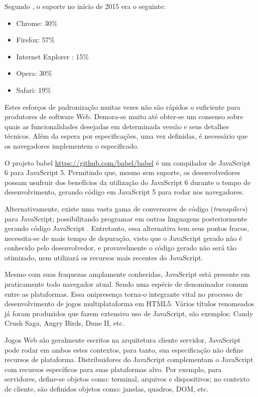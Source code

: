 Segundo \citet{ecmaSupport}, o suporte no início de 2015 era o seguinte:

\begin{itemize}
    \item Chrome: 30\%
    \item Firefox: 57\%
    \item Internet Explorer : 15\%
    \item Opera: 30\%
    \item Safari: 19\%
\end{itemize}

Estes esforços de padronização muitas vezes não são rápidos
o suficiente para produtores de software Web. Demora-se muito até
obter-se um consenso sobre quais as funcionalidades desejadas em
determinada versão e seus detalhes técnicos. Além da
espera por especificações, uma vez definidas, é necessário que os
navegadores implementem o especificado.

O projeto babel \url{https://github.com/babel/babel} é um compilador de
JavaScript 6 para JavaScript 5. Permitindo que, mesmo sem suporte, os
desenvolvedores possam usufruir dos benefícios da utilização do
JavaScript 6 durante o tempo de desenvolvimento, gerando código em
JavaScript 5 para rodar nos navegadores.

Alternativamente, existe uma vasta gama de conversores de código
(\textit{transpilers}) para JavaScript; possibilitando programar
em outras linguagens posteriormente gerando código JavaScript .
Entretanto, essa alternativa tem seus pontos fracos, necessita-se
de mais tempo de depuração, visto que o JavaScript gerado não é
conhecido pelo desenvolvedor, e provavelmente o código gerado não
será tão otimizado, nem utilizará os recursos mais recentes do
JavaScript.

Mesmo com suas fraquezas amplamente conhecidas, JavaScript está
presente em praticamente todo navegador atual. Sendo uma espécie de
denominador comum entre as plataformas. Essa onipresença torna-o
integrante vital no processo de desenvolvimento de jogos multiplataforma
em HTML5. Vários títulos renomeados já foram produzidos que fazem
extensivo uso de JavaScript, são exemplos: Candy Crush Saga, Angry
Birds, Dune II, etc.

Jogos Web são geralmente escritos na arquitetura cliente servidor,
JavaScript pode rodar em ambos estes contextos, para tanto, sua
especificação não define recursos de plataforma. Distribuidores do
JavaScript complementam o JavaScript com recursos específicos para
suas plataformas alvo. Por exemplo, para servidores, define-se objetos como:
terminal, arquivos e dispositivos; no contexto de cliente,
são definidos objetos como: janelas, quadros, DOM, etc.

